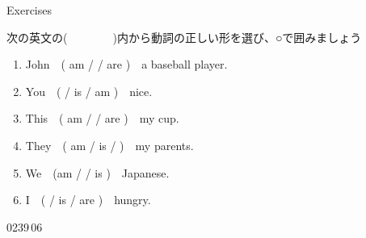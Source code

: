 \documentclass[aspectratio=169,xcolor={dvipsnames,table}]{beamer}
\begin{document}
%
%
%
\begin{frame}[plain]{Exercises}
 
{\small 次の英文の(~~~~~~~~)内から動詞の正しい形を選び、○で囲みましょう}

\begin{enumerate}
 \item John~~( am /  / are )~~a baseball player.
 \item You~~(  / is / am )~~nice.
 \item This~~( am /  / are )~~my cup.
 \item They~~( am / is /  )~~my parents.
 \item We~~(am /  / is )~~Japanese.
 \item I~~(  / is / are )~~hungry.
\end{enumerate}

\mbox{}\hfill{\tiny 0239}\,{\tiny {}06}

\end{frame}
\end{document}
